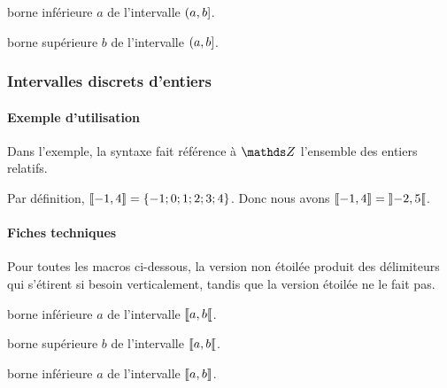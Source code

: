 \documentclass[12pt,a4paper]{article}
\theoremstyle{definition}
\begin{document}
\bigskip




 borne inférieure $a$ de l'intervalle $\intervalPC{a}{b}$.

 borne supérieure $b$ de l'intervalle $\intervalPC{a}{b}$.




\subsubsection{Intervalles discrets d'entiers}

\paragraph{Exemple d'utilisation}

Dans l'exemple, la syntaxe fait référence à $\ZZ$ l'ensemble des entiers relatifs.

\begin{tcblisting}{}
Par définition, $\ZintervalC{-1}{4} = \{ -1 ; 0 ; 1 ; 2 ; 3 ; 4 \}$. Donc nous avons
$\ZintervalC{-1}{4} = \ZintervalO{-2}{5}$.
\end{tcblisting}


\paragraph{Fiches techniques}

Pour toutes les macros ci-dessous, la version non étoilée produit des délimiteurs qui s'étirent si besoin verticalement, tandis que la version étoilée ne le fait pas.


\bigskip





 borne inférieure $a$ de l'intervalle $\ZintervalCO{a}{b}$.

 borne supérieure $b$ de l'intervalle $\ZintervalCO{a}{b}$.


\bigskip




 borne inférieure $a$ de l'intervalle $\ZintervalC{a}{b}$.
\end{document}
